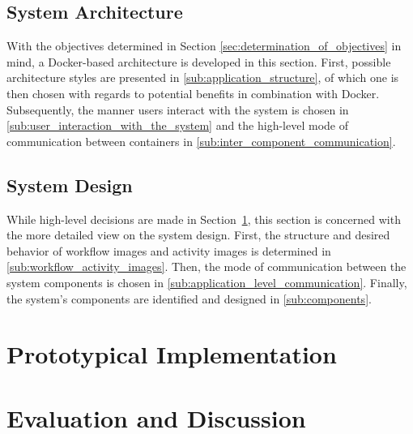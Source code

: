 \documentclass[language=english,noinputenc]{wiwwuwordrprt}
\begin{document}
    \section{System Architecture} %
      \label{sec:architecture}

      With the objectives determined in Section \ref{sec:determination_of_objectives} in mind, a Docker-based architecture is developed in this section. First, possible architecture styles are presented in \ref{sub:application_structure}, of which one is then chosen with regards to potential benefits in combination with Docker. Subsequently, the manner users interact with the system is chosen in \ref{sub:user_interaction_with_the_system} and the high-level mode of communication between containers in \ref{sub:inter_component_communication}.

      

    \section{System Design} %
      \label{sec:design}

      While high-level decisions are made in Section~\ref{sec:architecture}, this section is concerned with the more detailed view on the system design.
      First, the structure and desired behavior of workflow images and activity images is determined in \ref{sub:workflow_activity_images}. Then, the mode of communication between the system components is chosen in \ref{sub:application_level_communication}. Finally, the system's components are identified and designed in \ref{sub:components}.

      


  \chapter{Prototypical Implementation} %
    \label{cha:implementation}

    

  \chapter{Evaluation and Discussion} %
    \label{cha:evaluation}
    
\end{document}
